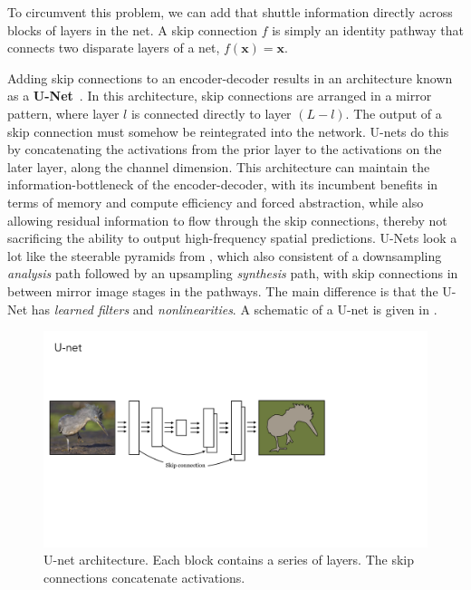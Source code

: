 
To circumvent this problem, we can add  that shuttle information directly across blocks of layers in the net. A skip connection $f$ is simply an identity pathway that connects two disparate layers of a net, $f(\mathbf{x}) = \mathbf{x}$.

Adding skip connections to an encoder-decoder results in an architecture known as a {\bf U-Net}~\cite{ronneberger2015u}. In this architecture, skip connections are arranged in a mirror pattern, where layer $l$ is connected directly to layer $(L-l)$. The output of a skip connection must somehow be reintegrated into the network. U-nets do this by concatenating the activations from the prior layer to the activations on the later layer, along the channel dimension. This architecture can maintain the information-bottleneck of the encoder-decoder, with its incumbent benefits in terms of memory and compute efficiency and forced abstraction, while also allowing residual information to flow through the skip connections, thereby not sacrificing the ability to output high-frequency spatial predictions. U-Nets look a lot like the steerable pyramids from \chap{\ref{chapter:image_pyramids}}, which also consistent of a downsampling \textit{analysis} path followed by an upsampling \textit{synthesis} path, with skip connections in between mirror image stages in the pathways. The main difference is that the U-Net has \textit{learned filters} and \textit{nonlinearities}. A schematic of a U-net is given in \fig{\ref{fig:convolutional_neural_nets:unet}}.
\begin{figure}[h]
    \centerline{
        \includegraphics[width=0.85\linewidth]{./figures/convolutional_neural_nets/unet.pdf}
    }
    \caption{U-net architecture. Each block contains a series of layers. The skip connections concatenate activations.}
    \label{fig:convolutional_neural_nets:unet}
\end{figure}

